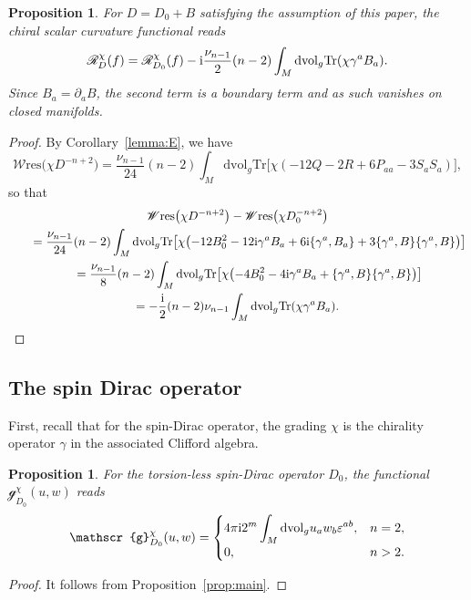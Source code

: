 \documentclass[10pt,a4paper]{amsart}
\numberwithin{equation}{section}
\newtheorem{Proposition}[Theorem]{Proposition}
\theoremstyle{definition}
\def\W{\mathscr{W} \mathrm{res}}
\def\Tr{\mathrm{Tr}}
\def\dv{\mathrm{dvol}_g}
\begin{document}
\begin{Proposition}
	\label{prop:EHchi}
 For $D = D_0+B$ satisfying the assumption of this paper, the chiral scalar curvature functional reads
 \[
 \mathscr{R}^\chi_D(f)=\mathscr{R}^\chi_{D_0}(f)- {\rm i} \frac{\nu_{n-1}}{2}(n-2) \int_M \dv \Tr (\chi \gamma^a B_a).
 \]
 Since $B_a=\partial_a B$, the second term is a boundary term and as such vanishes on closed manifolds.
\end{Proposition}
\begin{proof}
By Corollary~\ref{lemma:E}, we have
\[
 \W\bigl(\chi D^{-n+2}\bigr)=\frac{\nu_{n-1}}{24}(n-2)\int_M \dv \Tr \bigl[\chi(-12Q -2R +6P_{aa}-3S_aS_a)\bigr],
\]
so that
\begin{gather*}
 \W\bigl(\chi D^{-n+2}\bigr)-\W\bigl(\chi D_0^{-n+2}\bigr)\\
\qquad =\frac{\nu_{n-1}}{24}(n-2)\int_M \dv \Tr \bigl[\chi\bigl(-12 B_0^2-12{\rm i}\gamma^a B_a +6{\rm i}\{\gamma^a, B_a\}+3\{\gamma^a, B\}\{\gamma^a, B\}\bigr)\bigr]\\
\qquad=\frac{\nu_{n-1}}{8}(n-2)\int_M \dv \Tr \bigl[\chi\bigl(-4B_0^2 -4{\rm i} \gamma^a B_a +\{\gamma^a, B\}\{\gamma^a, B\}\bigr)\bigr]\\
 \qquad=-\frac{\rm i}{2}(n-2)\nu_{n-1}\int_M\dv \Tr(\chi \gamma^a B_a).\tag*{\qed}
\end{gather*} \renewcommand{\qed}{}
\end{proof}

\subsection{The spin Dirac operator}
First, recall that for the spin-Dirac operator, the grading $\chi$ is the chirality operator $\gamma$ in the associated Clifford algebra.
\begin{Proposition}\label{ch-g-spin}
	For the torsion-less spin-Dirac operator $D_0$, the functional $\mathscr{g}_{D_0}^\chi(u,w)$ reads
 \[
 \mathscr{g}_{D_0}^\chi(u,w)=
 \begin{cases}
 \displaystyle 4\pi {\rm i}{2^m}\int_M\dv u_a w_b \varepsilon^{ab}, & n=2,\\
 0, & n>2.
 \end{cases}
 \]
\end{Proposition}

\begin{proof}
 It follows from Proposition~\ref{prop:main}.
\end{proof}
\end{document}
